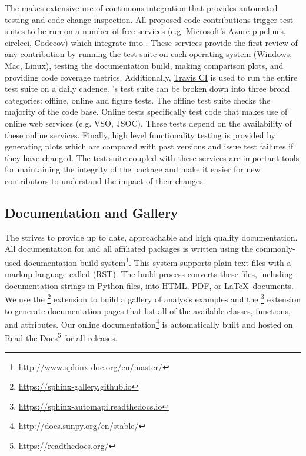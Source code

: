 The \sunpyproj makes extensive use of continuous integration that provides automated testing and code change inspection.
All proposed code contributions trigger test suites to be run on a number of free services (e.g.
Microsoft's Azure pipelines, circleci, Codecov) which integrate into \github.
These services provide the first review of any contribution by running the test suite on each operating system (Windows, Mac, Linux), testing the documentation build, making comparison plots, and providing code coverage metrics.
Additionally, \href{https://travis-ci.org}{Travis CI} is used to run the entire test suite on a daily cadence.
\sunpypkg's test suite can be broken down into three broad categories: offline, online and figure tests.
The offline test suite checks the majority of the code base.
Online tests specifically test code that makes use of online web services (e.g. VSO, JSOC).
These tests depend on the availability of these online services.
Finally, high level functionality testing is provided by generating plots which are compared with past versions and issue test failures if they have changed.
The \sunpypkg test suite coupled with these services are important tools for maintaining the integrity of the package and make it easier for new contributors to understand the impact of their changes.

\subsection{Documentation and Gallery}
\label{sec:docs}

The \sunpyproj strives to provide up to date, approachable and high quality documentation.
All documentation for \sunpypkg and all affiliated packages is written using the commonly-used  documentation build system\footnote{\url{http://www.sphinx-doc.org/en/master/}}.
This system supports plain text files with a markup language called  (RST).
The build process converts these files, including documentation strings in Python files, into HTML, PDF, or \LaTeX\ documents.
We use the \footnote{\url{https://sphinx-gallery.github.io}} extension to build a gallery of analysis examples and the \footnote{\url{https://sphinx-automapi.readthedocs.io}} extension to generate documentation pages that list all of the available classes, functions, and attributes.
Our online documentation\footnote{\url{http://docs.sunpy.org/en/stable/}} is automatically built and hosted on Read the Docs\footnote{\url{https://readthedocs.org/}} for all releases.
